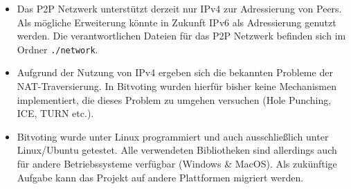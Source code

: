 \documentclass[colorback,accentcolor=tud1b]{tudreport}
\begin{document}
\begin{itemize}
\item Das P2P Netzwerk unterstützt derzeit nur IPv4 zur Adressierung von Peers. Als mögliche Erweiterung könnte in Zukunft IPv6 als Adressierung genutzt werden. Die verantwortlichen Dateien für das P2P Netzwerk befinden sich im Ordner \texttt{./network}.

\item Aufgrund der Nutzung von IPv4 ergeben sich die bekannten Probleme der NAT-Traversierung. In Bitvoting wurden hierfür bisher keine Mechanismen implementiert, die dieses Problem zu umgehen versuchen (Hole Punching, ICE, TURN etc.).

\item Bitvoting wurde unter Linux programmiert und auch ausschließlich unter Linux/Ubuntu getestet. Alle verwendeten Bibliotheken sind allerdings auch für andere Betriebssysteme verfügbar (Windows \& MacOS). Als zukünftige Aufgabe kann das Projekt auf andere Plattformen migriert werden.

\end{itemize}
\end{document}
